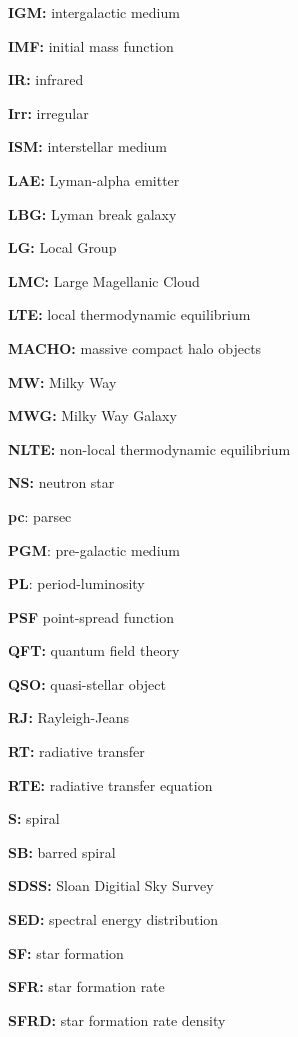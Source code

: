 \documentclass[a4paper,11pt]{article}
\begin{document}
{\noindent}\textbf{IGM:} intergalactic medium

{\noindent}\textbf{IMF:} initial mass function

{\noindent}\textbf{IR:} infrared

{\noindent}\textbf{Irr:} irregular

{\noindent}\textbf{ISM:} interstellar medium

{\noindent}\textbf{LAE:} Lyman-alpha emitter

{\noindent}\textbf{LBG:} Lyman break galaxy

{\noindent}\textbf{LG:} Local Group

{\noindent}\textbf{LMC:} Large Magellanic Cloud

{\noindent}\textbf{LTE:} local thermodynamic equilibrium

{\noindent}\textbf{MACHO:} massive compact halo objects

{\noindent}\textbf{MW:} Milky Way

{\noindent}\textbf{MWG:} Milky Way Galaxy

{\noindent}\textbf{NLTE:} non-local thermodynamic equilibrium

{\noindent}\textbf{NS:} neutron star

{\noindent}\textbf{pc}: parsec

{\noindent}\textbf{PGM}: pre-galactic medium

{\noindent}\textbf{PL}: period-luminosity

{\noindent}\textbf{PSF} point-spread function

{\noindent}\textbf{QFT:} quantum field theory

{\noindent}\textbf{QSO:} quasi-stellar object

{\noindent}\textbf{RJ:} Rayleigh-Jeans

{\noindent}\textbf{RT:} radiative transfer

{\noindent}\textbf{RTE:} radiative transfer equation

{\noindent}\textbf{S:} spiral

{\noindent}\textbf{SB:} barred spiral

{\noindent}\textbf{SDSS:} Sloan Digitial Sky Survey

{\noindent}\textbf{SED:} spectral energy distribution

{\noindent}\textbf{SF:} star formation

{\noindent}\textbf{SFR:} star formation rate

{\noindent}\textbf{SFRD:} star formation rate density
\end{document}
